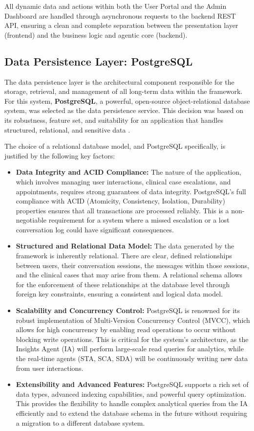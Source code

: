 All dynamic data and actions within both the User Portal and the Admin Dashboard are handled through asynchronous requests to the backend REST API, ensuring a clean and complete separation between the presentation layer (frontend) and the business logic and agentic core (backend).

\subsection{Data Persistence Layer: PostgreSQL}

The data persistence layer is the architectural component responsible for the storage, retrieval, and management of all long-term data within the framework. For this system, \textbf{PostgreSQL}, a powerful, open-source object-relational database system, was selected as the data persistence service. This decision was based on its robustness, feature set, and suitability for an application that handles structured, relational, and sensitive data \cite{FIND_CITATION_HERE}.

The choice of a relational database model, and PostgreSQL specifically, is justified by the following key factors:

\begin{itemize}
    \item \textbf{Data Integrity and ACID Compliance:} The nature of the application, which involves managing user interactions, clinical case escalations, and appointments, requires strong guarantees of data integrity. PostgreSQL's full compliance with ACID (Atomicity, Consistency, Isolation, Durability) properties ensures that all transactions are processed reliably. This is a non-negotiable requirement for a system where a missed escalation or a lost conversation log could have significant consequences.
    \item \textbf{Structured and Relational Data Model:} The data generated by the framework is inherently relational. There are clear, defined relationships between users, their conversation sessions, the messages within those sessions, and the clinical cases that may arise from them. A relational schema allows for the enforcement of these relationships at the database level through foreign key constraints, ensuring a consistent and logical data model.
    \item \textbf{Scalability and Concurrency Control:} PostgreSQL is renowned for its robust implementation of Multi-Version Concurrency Control (MVCC), which allows for high concurrency by enabling read operations to occur without blocking write operations. This is critical for the system's architecture, as the Insights Agent (IA) will perform large-scale read queries for analytics, while the real-time agents (STA, SCA, SDA) will be continuously writing new data from user interactions.
    \item \textbf{Extensibility and Advanced Features:} PostgreSQL supports a rich set of data types, advanced indexing capabilities, and powerful query optimization. This provides the flexibility to handle complex analytical queries from the IA efficiently and to extend the database schema in the future without requiring a migration to a different database system.
\end{itemize}

